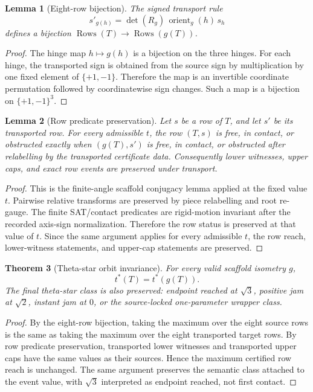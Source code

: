 \documentclass[11pt,a4paper]{article}
\newtheorem{theorem}{Theorem}[section]
\newtheorem{lemma}[theorem]{Lemma}
\theoremstyle{definition}
\theoremstyle{remark}
\begin{document}
\begin{lemma}[Eight-row bijection]
The signed transport rule
\[
  s'_{g(h)} = \det(R_g)\, \operatorname{orient}_g(h)\, s_h
\]
defines a bijection \(\operatorname{Rows}(T)\to\operatorname{Rows}(g(T))\).
\end{lemma}

\begin{proof}
The hinge map \(h \mapsto g(h)\) is a bijection on the three hinges.  For each hinge, the transported sign is obtained from the source sign by multiplication by one fixed element of \(\{+1,-1\}\).  Therefore the map is an invertible coordinate permutation followed by coordinatewise sign changes.  Such a map is a bijection on \(\{+1,-1\}^3\).
\end{proof}

\begin{lemma}[Row predicate preservation]
Let \(s\) be a row of \(T\), and let \(s'\) be its transported row.  For every admissible \(t\), the row \((T,s)\) is free, in contact, or obstructed exactly when \((g(T),s')\) is free, in contact, or obstructed after relabelling by the transported certificate data.  Consequently lower witnesses, upper caps, and exact row events are preserved under transport.
\end{lemma}

\begin{proof}
This is the finite-angle scaffold conjugacy lemma applied at the fixed value \(t\).  Pairwise relative transforms are preserved by piece relabelling and root re-gauge.  The finite SAT/contact predicates are rigid-motion invariant after the recorded axis-sign normalization.  Therefore the row status is preserved at that value of \(t\).  Since the same argument applies for every admissible \(t\), the row reach, lower-witness statements, and upper-cap statements are preserved.
\end{proof}

\begin{theorem}[Theta-star orbit invariance]
For every valid scaffold isometry \(g\),
\[
  t^*(T)=t^*(g(T)).
\]
The final theta-star class is also preserved: endpoint reached at \(\sqrt{3}\), positive jam at \(\sqrt{2}\), instant jam at \(0\), or the source-locked one-parameter wrapper class.
\end{theorem}

\begin{proof}
By the eight-row bijection, taking the maximum over the eight source rows is the same as taking the maximum over the eight transported target rows.  By row predicate preservation, transported lower witnesses and transported upper caps have the same values as their sources.  Hence the maximum certified row reach is unchanged.  The same argument preserves the semantic class attached to the event value, with \(\sqrt{3}\) interpreted as endpoint reached, not first contact.
\end{proof}
\end{document}
